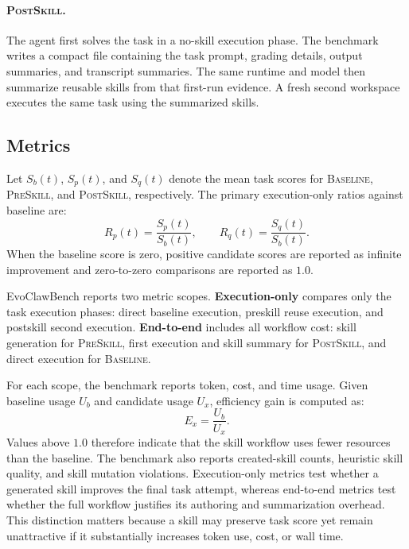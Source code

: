 \documentclass[11pt]{article}
\newcommand{\ours}{EvoClawBench}
\newcommand{\baseline}{\textsc{Baseline}}
\newcommand{\preskill}{\textsc{PreSkill}}
\newcommand{\postskill}{\textsc{PostSkill}}
\begin{document}
\paragraph{\postskill{}.}
The agent first solves the task in a no-skill execution phase.
The benchmark writes a compact file containing the task prompt, grading details, output summaries, and transcript summaries.
The same runtime and model then summarize reusable skills from that first-run evidence.
A fresh second workspace executes the same task using the summarized skills.

\subsection{Metrics}
\label{subsec:metrics}

Let $S_b(t)$, $S_p(t)$, and $S_q(t)$ denote the mean task scores for \baseline{}, \preskill{}, and \postskill{}, respectively.
The primary execution-only ratios against baseline are:
\begin{equation}
    R_p(t) = \frac{S_p(t)}{S_b(t)}, \qquad
    R_q(t) = \frac{S_q(t)}{S_b(t)}.
\end{equation}
When the baseline score is zero, positive candidate scores are reported as infinite improvement and zero-to-zero comparisons are reported as $1.0$.

\ours{} reports two metric scopes.
\textbf{Execution-only} compares only the task execution phases: direct baseline execution, preskill reuse execution, and postskill second execution.
\textbf{End-to-end} includes all workflow cost: skill generation for \preskill{}, first execution and skill summary for \postskill{}, and direct execution for \baseline{}.

For each scope, the benchmark reports token, cost, and time usage.
Given baseline usage $U_b$ and candidate usage $U_x$, efficiency gain is computed as:
\begin{equation}
    E_x = \frac{U_b}{U_x}.
\end{equation}
Values above $1.0$ therefore indicate that the skill workflow uses fewer resources than the baseline.
The benchmark also reports created-skill counts, heuristic skill quality, and skill mutation violations.
Execution-only metrics test whether a generated skill improves the final task attempt, whereas end-to-end metrics test whether the full workflow justifies its authoring and summarization overhead.
This distinction matters because a skill may preserve task score yet remain unattractive if it substantially increases token use, cost, or wall time.
\end{document}
